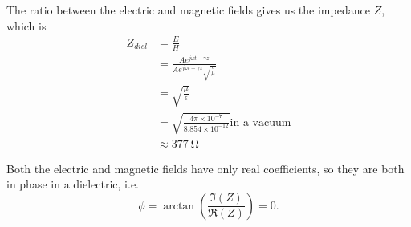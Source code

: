 \documentclass{tufte-handout}
\begin{document}
The ratio between the electric and magnetic fields gives us the impedance $Z$, which is
\begin{align}
Z_{diel} &= \frac{E}{H} \\
 &= \frac{A e^{j\omega t - \gamma z}}{A e^{j\omega t - \gamma z} \sqrt{\frac{\epsilon}{\mu}}} \\
 & =  \sqrt{\frac{\mu}{\epsilon}} \\
 & = \sqrt{\frac{4\pi\times 10^{-7}}{8.854\times 10^{-12}}} \text{in a vacuum}\\
 & \approx \SI{377}{\ohm}
\end{align}

Both the electric and magnetic fields have only real coefficients, so they are both in phase in a dielectric, i.e.
\begin{equation}
\phi = \arctan(\frac{\Im(Z)}{\Re(Z)}) = 0.
\end{equation}
\end{document}
